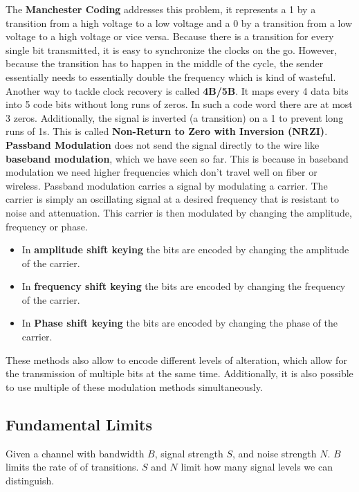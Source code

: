 The \textbf{Manchester Coding} addresses this problem, it represents a 1 by a transition from a high voltage to a low voltage and a 0 by a transition from a low voltage to a high voltage or vice versa. Because there is a transition for every single bit transmitted, it is easy to synchronize the clocks on the go. However, because the transition has to happen in the middle of the cycle, the sender essentially needs to essentially double the frequency which is kind of wasteful. \vspace{.3cm}\\

Another way to tackle clock recovery is called \textbf{4B/5B}. It maps every 4 data bits into 5 code bits without long runs of zeros. In such a code word there are at most 3 zeros. Additionally, the signal is inverted (a transition) on a 1 to prevent long runs of 1s. This is called \textbf{Non-Return to Zero with Inversion (NRZI)}. \vspace{.3cm}\\

\textbf{Passband Modulation} does not send the signal directly to the wire like \textbf{baseband modulation}, which we have seen so far. This is because in baseband modulation we need higher frequencies which don't travel well on fiber or wireless. Passband modulation carries a signal by modulating a carrier. The carrier is simply an oscillating signal at a desired frequency that is resistant to noise and attenuation. This carrier is then modulated by changing the amplitude, frequency or phase.\\
\begin{itemize}
\item In \textbf{amplitude shift keying} the bits are encoded by changing the amplitude of the carrier.
\item In \textbf{frequency shift keying} the bits are encoded by changing the frequency of the carrier.
\item In \textbf{Phase shift keying} the bits are encoded by changing the phase of the carrier.
\end{itemize}
These methods also allow to encode different levels of alteration, which allow for the transmission of multiple bits at the same time. Additionally, it is also possible to use multiple of these modulation methods simultaneously.

\subsection{Fundamental Limits}
Given a channel with bandwidth $B$, signal strength $S$, and noise strength $N$. $B$ limits the rate of of transitions. $S$ and $N$ limit how many signal levels we can distinguish.\vspace{.3cm}\\

